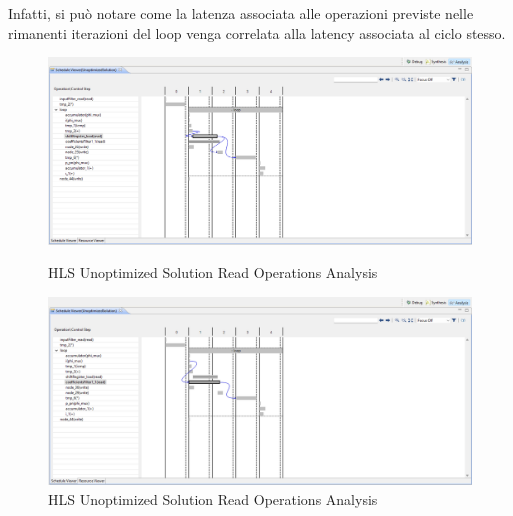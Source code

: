 Infatti, si può notare come la latenza associata alle operazioni previste nelle rimanenti iterazioni del loop venga correlata alla latency associata al ciclo stesso.
\begin{figure}[H]
    \centering
    \begin{minipage}[b]{0.45\textwidth}
        \centering
        \includegraphics[width=\textwidth]{solutions/unoptimized/cyclesunoptimized3.png}
        \caption{HLS Unoptimized Solution Read Operations Analysis}
        \label{fig:left}
    \end{minipage}
    \hfill
    \begin{minipage}[b]{0.45\textwidth}
        \centering
        \includegraphics[width=\textwidth]{solutions/unoptimized/cyclesunoptimized4.png}
        \caption{HLS Unoptimized Solution Read Operations Analysis}
        \label{fig:right}
    \end{minipage}
\end{figure}
